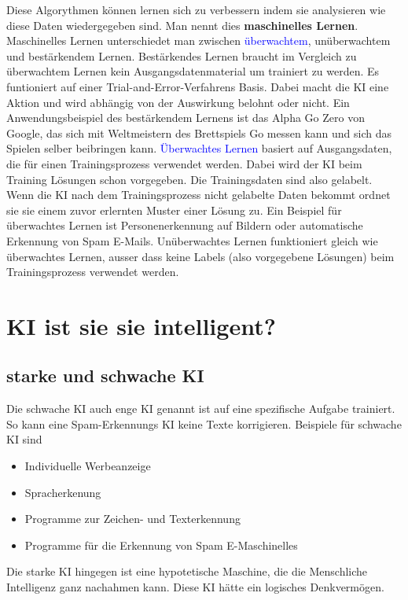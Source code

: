 \documentclass{report}
\begin{document}
Diese Algorythmen können lernen sich zu verbessern indem sie analysieren wie diese Daten wiedergegeben sind. Man nennt dies \textbf{maschinelles Lernen}.
Maschinelles Lernen unterschiedet man zwischen \textcolor{blue}{überwachtem}, unüberwachtem und bestärkendem Lernen. Bestärkendes Lernen braucht im Vergleich zu
überwachtem Lernen kein Ausgangsdatenmaterial um trainiert zu werden. Es funtioniert auf einer Trial-and-Error-Verfahrens Basis. Dabei macht die KI
eine Aktion und wird abhängig von der Auswirkung belohnt oder nicht. Ein Anwendungsbeispiel des bestärkendem Lernens ist das Alpha Go Zero von Google, das 
sich mit Weltmeistern des Brettspiels Go messen kann und sich das Spielen selber beibringen kann.
\textcolor{blue}{Überwachtes Lernen} basiert auf Ausgangsdaten, die für einen Trainingsprozess verwendet werden.\citep{bigdatainsider} Dabei wird der KI beim Training Lösungen  
schon vorgegeben. Die Trainingsdaten sind also gelabelt. Wenn die KI nach dem Trainingsprozess nicht gelabelte Daten bekommt ordnet sie sie einem zuvor erlernten
Muster einer Lösung zu. Ein Beispiel für überwachtes Lernen ist Personenerkennung auf Bildern oder automatische Erkennung von Spam E-Mails.
Unüberwachtes Lernen funktioniert gleich wie überwachtes Lernen, ausser dass keine Labels (also vorgegebene Lösungen) beim Trainingsprozess verwendet werden.


\chapter{KI ist sie sie intelligent?}

\section{starke und schwache KI}
Die schwache KI auch enge KI genannt ist auf eine spezifische Aufgabe trainiert. So kann eine Spam-Erkennungs KI keine Texte korrigieren.
Beispiele für schwache KI sind \begin{itemize}
    \item Individuelle Werbeanzeige
    \item Spracherkenung
    \item Programme zur Zeichen- und Texterkennung
    \item Programme für die Erkennung von Spam E-Maschinelles
\end{itemize}

Die starke KI hingegen ist eine hypotetische Maschine, die die Menschliche Intelligenz ganz nachahmen kann. Diese KI hätte ein logisches Denkvermögen.


\nocite{*}
\printbibliography
\end{document}
